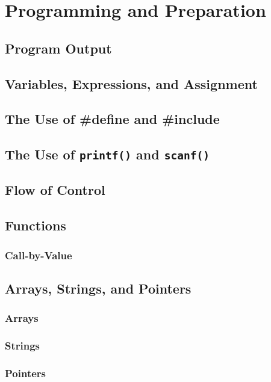 \documentclass[12pt]{book}
\begin{document}
\chapter{Programming and Preparation}

\section{Program Output} \label{sec:program_output}
\section{Variables, Expressions, and Assignment} \label{sec:variables_expressions_assignment}
\section{The Use of \#define and \#include} \label{sec:use_define_include}
\section{The Use of \texttt{printf()} and \texttt{scanf()}} \label{sec:use_printf_scanf}
\section{Flow of Control} \label{sec:flow_of_control}
\section{Functions} \label{sec:functions}
\subsection{Call-by-Value} \label{sec:call_by_value}
\section{Arrays, Strings, and Pointers} \label{sec:arrays_strings_pointers}
\subsection{Arrays} \label{sec:arrays}
\subsection{Strings} \label{sec:strings}
\subsection{Pointers} \label{sec:pointers}
\end{document}
